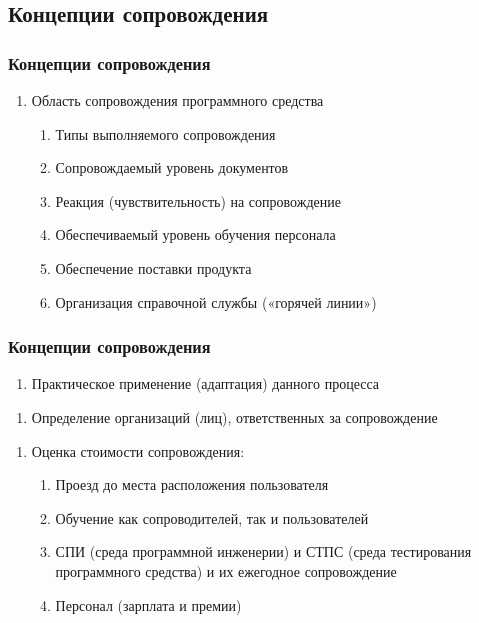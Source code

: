 \documentclass{industrial-development}
\begin{document}
\subsection{Концепции сопровождения}
\begin{frame} \frametitle{Концепции сопровождения}
	\begin{enumerate}
	\item Область сопровождения программного средства
		\begin{enumerate} 
		\item Типы выполняемого сопровождения
		\item Сопровождаемый уровень документов
		\item Реакция (чувствительность) на сопровождение
		\item Обеспечиваемый уровень обучения персонала 
		\item Обеспечение поставки продукта
		\item Организация справочной службы («горячей линии») 
		\end{enumerate}
	\end{enumerate}
\end{frame}

\lecturenotes

\begin{frame} \frametitle{Концепции сопровождения}
	\begin{enumerate}[2]
	\item Практическое применение (адаптация) данного процесса
	\end{enumerate}
	\begin{enumerate}[3]
	\item Определение организаций (лиц), ответственных за сопровождение
	\end{enumerate}
	\begin{enumerate}[4]
	\item Оценка стоимости сопровождения: 
		\begin{enumerate}
		\item Проезд до места расположения пользователя 
		\item Обучение как сопроводителей, так и пользователей
		\item СПИ (среда программной инженерии) и СТПС (среда тестирования программного средства) и их ежегодное сопровождение
		\item Персонал (зарплата и премии) 
		\end{enumerate}
	\end{enumerate}
\end{frame}
\end{document}
